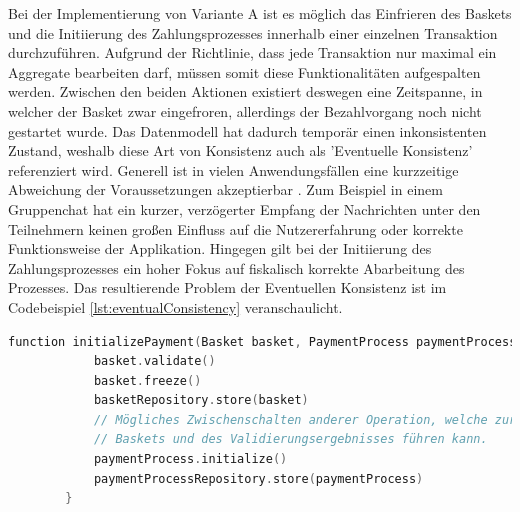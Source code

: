 Bei der Implementierung von Variante A ist es möglich das Einfrieren des Baskets und die Initiierung des Zahlungsprozesses innerhalb einer einzelnen Transaktion durchzuführen. Aufgrund der Richtlinie, dass jede Transaktion nur maximal ein Aggregate bearbeiten darf, müssen somit diese Funktionalitäten aufgespalten werden. Zwischen den beiden Aktionen existiert deswegen eine Zeitspanne, in welcher der Basket zwar eingefroren, allerdings der Bezahlvorgang noch nicht gestartet wurde. Das Datenmodell hat dadurch temporär einen inkonsistenten Zustand, weshalb diese Art von Konsistenz auch als 'Eventuelle Konsistenz' referenziert wird. Generell ist in vielen Anwendungsfällen eine kurzzeitige Abweichung der Voraussetzungen akzeptierbar \cite[S. 364f.]{Vernon.2011}. Zum Beispiel in einem Gruppenchat hat ein kurzer, verzögerter Empfang der Nachrichten unter den Teilnehmern keinen großen Einfluss auf die Nutzererfahrung oder korrekte Funktionsweise der Applikation. Hingegen gilt bei der Initiierung des Zahlungsprozesses ein hoher Fokus auf fiskalisch korrekte Abarbeitung des Prozesses. Das resultierende Problem der Eventuellen Konsistenz ist im Codebeispiel \ref{lst:eventualConsistency} veranschaulicht.

\vspace{0.5cm}
\begin{minipage}{\linewidth} %
	\begin{lstlisting}[caption={Getrennte Transaktionen für die Initiierung des Bezahlvorgangs}, label={lst:eventualConsistency}, language=Kotlin]
		function initializePayment(Basket basket, PaymentProcess paymentProcess) {
			basket.validate()
			basket.freeze()
			basketRepository.store(basket)
			// Mögliches Zwischenschalten anderer Operation, welche zur Abänderung des
			// Baskets und des Validierungsergebnisses führen kann.
			paymentProcess.initialize()
			paymentProcessRepository.store(paymentProcess)
		}
	\end{lstlisting}
\end{minipage}
\vspace{0.1cm}


